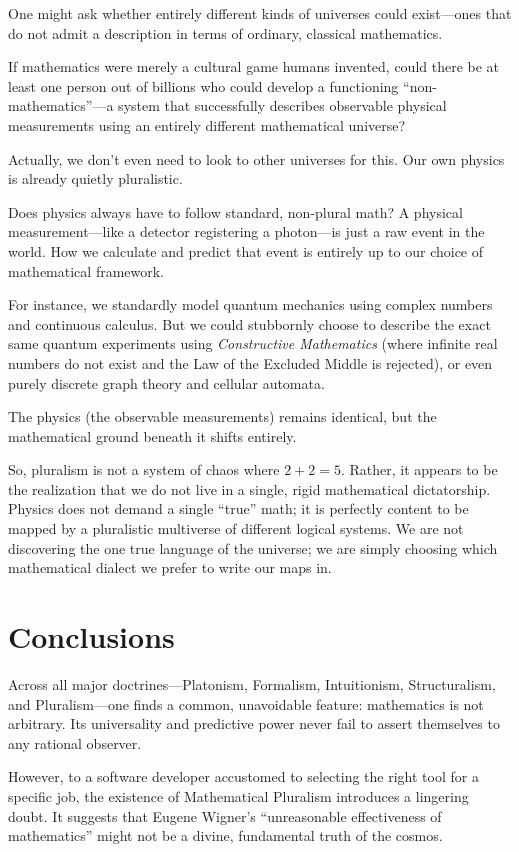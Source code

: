 One might ask whether entirely different kinds of universes could exist---ones that do not admit a description in terms of ordinary, classical mathematics. 

If mathematics were merely a cultural game humans invented, could there be at least one person out of billions who could develop a functioning ``non-mathematics''---a system that successfully describes observable physical measurements using an entirely different mathematical universe? 

Actually, we don't even need to look to other universes for this.
Our own physics is already quietly pluralistic. 

Does physics always have to follow standard, non-plural math?
A physical measurement---like a detector registering a photon---is just a raw event in the world. How we calculate and predict that event is entirely up to our choice of mathematical framework. 

For instance, we standardly model quantum mechanics using complex numbers and continuous calculus.
But we could stubbornly choose to describe the exact same quantum experiments using \emph{Constructive Mathematics} (where infinite real numbers do not exist and the Law of the Excluded Middle is rejected), or even purely discrete graph theory and cellular automata. 

The physics (the observable measurements) remains identical, but the mathematical ground beneath it shifts entirely. 

So, pluralism is not a system of chaos where $2+2=5$.
Rather, it appears to be the realization that we do not live in a single, rigid mathematical dictatorship.
Physics does not demand a single ``true'' math; it is perfectly content to be mapped by a pluralistic multiverse of different logical systems.
We are not discovering the one true language of the universe; we are simply choosing which mathematical dialect we prefer to write our maps in.


\section{Conclusions}

Across all major doctrines---Platonism, Formalism, Intuitionism, Structuralism, and Pluralism---one finds a common, unavoidable feature: mathematics is not arbitrary.
Its universality and predictive power never fail to assert themselves to any rational observer.

However, to a software developer accustomed to selecting the right tool for a specific job, the existence of Mathematical Pluralism introduces a lingering doubt.
It suggests that Eugene Wigner’s ``unreasonable effectiveness of mathematics'' might not be a divine, fundamental truth of the cosmos.

